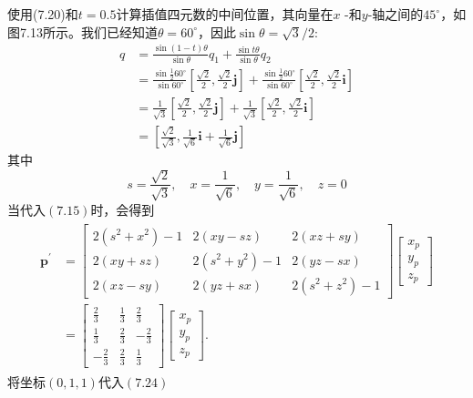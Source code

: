 使用(7.20)和$t=0.5$计算插值四元数的中间位置，其向量在$x$ -和$y$-轴之间的$45^{\circ}$，如图7.13所示。我们已经知道$\theta=60^{\circ}$，因此$\sin \theta=\sqrt{3}/ 2$:
$$
\begin{aligned}
q & =\frac{\sin (1-t) \theta}{\sin \theta} q_{1}+\frac{\sin t \theta}{\sin \theta} q_{2} \\
& =\frac{\sin \frac{1}{2} 60^{\circ}}{\sin 60^{\circ}}\left[\frac{\sqrt{2}}{2}, \frac{\sqrt{2}}{2} \mathbf{j}\right]+\frac{\sin \frac{1}{2} 60^{\circ}}{\sin 60^{\circ}}\left[\frac{\sqrt{2}}{2}, \frac{\sqrt{2}}{2} \mathbf{i}\right]\\
& =\frac{1}{\sqrt{3}}\left[\frac{\sqrt{2}}{2}, \frac{\sqrt{2}}{2} \mathbf{j}\right]+\frac{1}{\sqrt{3}}\left[\frac{\sqrt{2}}{2}, \frac{\sqrt{2}}{2} \mathbf{i}\right] \\
& =\left[\frac{\sqrt{2}}{\sqrt{3}}, \frac{1}{\sqrt{6}} \mathbf{i}+\frac{1}{\sqrt{6}} \mathbf{j}\right]
\end{aligned}
$$
其中
$$
s=\frac{\sqrt{2}}{\sqrt{3}}, \quad x=\frac{1}{\sqrt{6}}, \quad y=\frac{1}{\sqrt{6}}, \quad z=0
$$
当代入$(7.15)$时，会得到
\begin{align}
    \begin{aligned}
\mathbf{p}^{\prime} & =\left[\begin{array}{ccc}
2\left(s^{2}+x^{2}\right)-1 & 2(x y-s z) & 2(x z+s y) \\
2(x y+s z) & 2\left(s^{2}+y^{2}\right)-1 & 2(y z-s x) \\
2(x z-s y) & 2(y z+s x) & 2\left(s^{2}+z^{2}\right)-1
\end{array}\right]\left[\begin{array}{l}
x_{p} \\
y_{p} \\
z_{p}
\end{array}\right] \\
& =\left[\begin{array}{ccc}
\frac{2}{3} & \frac{1}{3} & \frac{2}{3} \\
\frac{1}{3} & \frac{2}{3} & -\frac{2}{3} \\
-\frac{2}{3} & \frac{2}{3} & \frac{1}{3}
\end{array}\right]\left[\begin{array}{l}
x_{p} \\
y_{p} \\
z_{p}
\end{array}\right] .
\end{aligned}
\end{align}
将坐标$(0,1,1)$代入$(7.24)$
